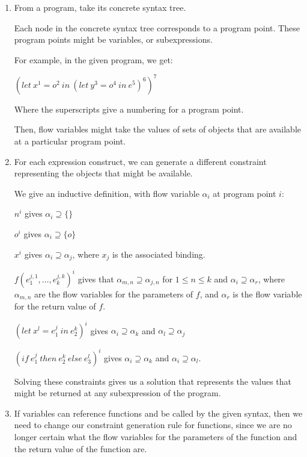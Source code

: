 


\begin{enumerate}[label=(\alph*)]

  \item

    From a program, take its concrete syntax tree.

    Each node in the concrete syntax tree corresponds to a program point. These program points might be variables,  or subexpressions.

    For example, in the given program, we get:

    $(let\ x^1 = o^2\ in\ (let\ y^3 = o^4\ in\ e^5)^6)^7$

    Where the superscripts give a numbering for a program point.

    Then, flow variables might take the values of sets of objects that are available at a particular program point.

    \item
      For each expression construct, we can generate a different constraint representing the objects that might be available.

      We give an inductive definition, with flow variable $\alpha_i$ at program point $i$:

      $n^i$ gives $\alpha_i \supseteq \{\}$

      $o^i$ gives $\alpha_i \supseteq \{o\}$

      $x^i$ gives $\alpha_i \supseteq \alpha_j$, where $x_j$ is the associated binding.

      $f(e_1^{j,1}, \ldots, e_k^{j,k})^i$ gives that $\alpha_{m,n} \supseteq \alpha_{j,n}$ for $1 \leq n \leq k$ and $\alpha_{i} \supseteq \alpha_r$, where $\alpha_{m,n}$ are the flow variables for the parameters of $f$, and $\alpha_r$ is the flow variable for the return value of $f$.

      $(let\ x^l = e_1^j\ in\ e_2^k)^i$ gives $\alpha_i \supseteq \alpha_k$ and $\alpha_l \supseteq \alpha_j$

      $(if\ e_1^j\ then\ e_2^k\ else\ e_3^l)^i$ gives $\alpha_i \supseteq \alpha_k$ and $\alpha_i \supseteq \alpha_l$.

      Solving these constraints gives us a solution that represents the values that might be returned at any subexpression of the program.

      \item
        If variables can reference functions and be called by the given syntax, then we need to change our constraint generation rule for functions, since we are no longer certain what the flow variables for the parameters of the function and the return value of the function are.


\end{enumerate}
